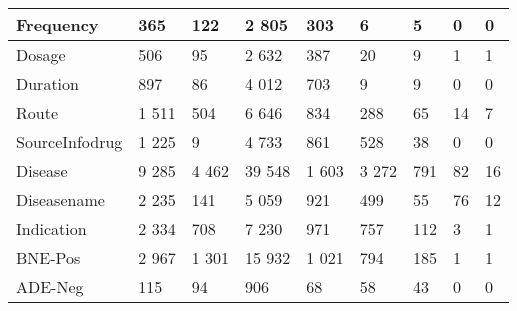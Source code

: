 \begin{tabular}{|l|l|l|p{}|p{}|l|l|l|l|}
\hline
Frequency                                                                          & 365    & 122    & 2 805                            & 303              & 6     & 5                    & 0     & 0                       \\ 
\hline
Dosage                                                                             & 506    & 95     & 2 632                            & 387              & 20    & 9                    & 1     & 1                       \\ 
\hline
Duration                                                                           & 897    & 86     & 4 012                            & 703              & 9     & 9                    & 0     & 0                       \\ 
\hline
Route                                                                              & 1 511  & 504    & 6 646                            & 834              & 288   & 65                   & 14    & 7                       \\ 
\hline
SourceInfodrug                                                                     & 1 225  & 9      & 4 733                           & 861              & 528   & 38                   & 0     & 0                       \\ 
\hline
Disease                                                                            & 9 285  & 4 462   & 39 548                           & 1 603             & 3 272  & 791                  & 82    & 16                      \\ 
\hline
Diseasename                                                                        & 2 235  & 141    & 5 059                            & 921              & 499   & 55                   & 76    & 12                      \\ 
\hline
Indication                                                                         & 2 334  & 708    & 7 230                           & 971              & 757   & 112                  & 3     & 1                       \\ 
\hline
BNE-Pos                                                                            & 2 967  & 1 301   & 15 932                           & 1 021             & 794   & 185                  & 1     & 1                       \\ 
\hline
ADE-Neg                                                                            & 115    & 94     & 906                            & 68               & 58    & 43                   & 0     & 0                       \\ 

\end{tabular}
